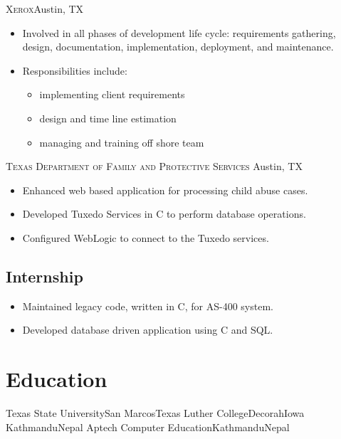 \documentclass[11pt,letterpaper,sans]{moderncv}
\begin{document}
     {\textsc{Xerox}}{Austin, TX}{}
     {\begin{itemize}
         \item Involved in all phases of development life cycle:
               requirements gathering, design, documentation,
               implementation, deployment, and maintenance.
         \item Responsibilities include:
               {\begin{itemize}
                   \item implementing client requirements
                   \item design and time line estimation
                   \item managing and training off shore team
               \end{itemize}}
     \end{itemize}}
     
     {\textsc{Texas Department of Family and Protective Services}}
             {Austin, TX}{}
     {\begin{itemize}
         \item Enhanced web based application for processing child
               abuse cases.
         \item Developed Tuxedo Services in C to perform database operations.
         \item Configured WebLogic to connect to the Tuxedo services.
     \end{itemize}}

  \subsection{Internship}
     {\begin{itemize}
         \item Maintained legacy code, written in C, for AS-400 system.
         \item Developed database driven application using C and SQL.
     \end{itemize}}



\section{Education}
           {Texas State University}{San Marcos}{Texas}{}
           {Luther College}{Decorah}{Iowa}{}
           {Kathmandu}{Nepal}{}
           {Aptech Computer Education}{Kathmandu}{Nepal}{}


\end{document}
